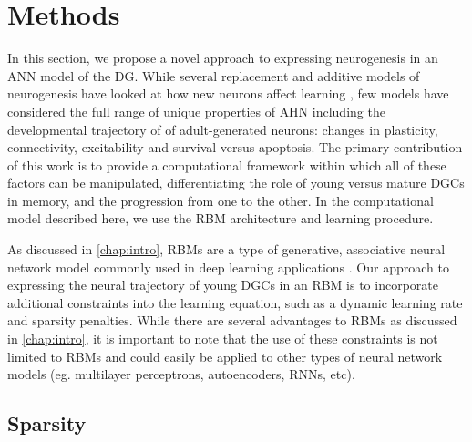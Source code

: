 \section{Methods}

In this section, we propose a novel approach to expressing neurogenesis in
an \ac{ANN} model of the \ac{DG}. 
While several replacement and
additive models of neurogenesis have looked at how new neurons affect
learning \citep[e.g.][]{replacement_neurogenesis, additive_neurogenesis}, 
few models have considered the full range of unique properties of \ac{AHN}
including the developmental trajectory of 
of adult-generated neurons: changes in plasticity, connectivity, excitability
and survival versus apoptosis. 
The primary contribution of this work is to provide a computational framework
within which all of these factors can be manipulated, 
differentiating the role of young versus mature \acp{DGC} in memory, and the
progression from one to the other. 
In the computational model described
here, we use the \ac{RBM} 
\citep{hinton-cd, smolensky-86, freund-haussler-92} architecture and learning
procedure. 

As discussed in \cref{chap:intro}, \acp{RBM} are a type of generative, 
associative neural network model commonly used in deep learning applications \citep[see
e.g.][]{deep_belief_nets,nair-hinton-09}. 
Our approach to expressing the neural trajectory of 
young \acp{DGC} in an \ac{RBM} is to incorporate additional constraints into the learning equation, 
such as a dynamic learning rate and sparsity penalties. 
While there are several advantages to \acp{RBM} as discussed in \cref{chap:intro},
it is important to note that the use of these constraints is
not limited to \acp{RBM} and could easily be applied to other
types of neural network models (eg. multilayer perceptrons, autoencoders, \acp{RNN}, etc).

\subsection{Sparsity}

